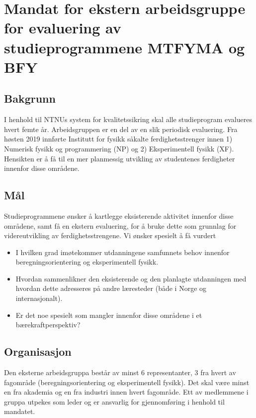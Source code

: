 \documentclass{article}
\begin{document}
\appendix
\section{Mandat for ekstern arbeidsgruppe for evaluering av studieprogrammene MTFYMA og BFY}
\subsection{Bakgrunn}
I henhold til NTNUs system for kvalitetssikring skal alle studieprogram evalueres hvert femte år. Arbeidsgruppen er en del av en slik periodisk evaluering. Fra høsten 2019 innførte Institutt for fysikk såkalte ferdighetsstrenger innen 1) Numerisk fysikk og programmering (NP) og 2) Eksperimentell fysikk (XF). Hensikten er å få til en mer planmessig utvikling av studentenes ferdigheter innenfor disse områdene. 
\subsection{Mål}
Studieprogrammene ønsker å kartlegge eksisterende aktivitet innenfor disse områdene, samt få en ekstern evaluering, for å bruke dette som grunnlag for videreutvikling av ferdighetsstrengene.
Vi ønsker spesielt å få vurdert
\begin{itemize}
  \item I hvilken grad imøtekommer utdanningene samfunnets behov innenfor beregningsorientering og eksperimentell fysikk.
  \item Hvordan sammenlikner den eksisterende og den planlagte utdanningen med hvordan dette adresseres på andre læresteder (både i Norge og internasjonalt).
  \item Er det noe spesielt som mangler innenfor disse områdene i et bærekraftperspektiv?
\end{itemize}
\subsection{Organisasjon}
Den eksterne arbeidsgruppa består av minst 6 representanter, 3 fra hvert av fagområde (beregningsorientering og eksperimentell fysikk). Det skal være minst en fra akademia og en fra industri innen hvert fagområde.
Ett av medlemmene i gruppa utpekes som leder og er ansvarlig for gjennomføring i henhold til mandatet.
\end{document}
